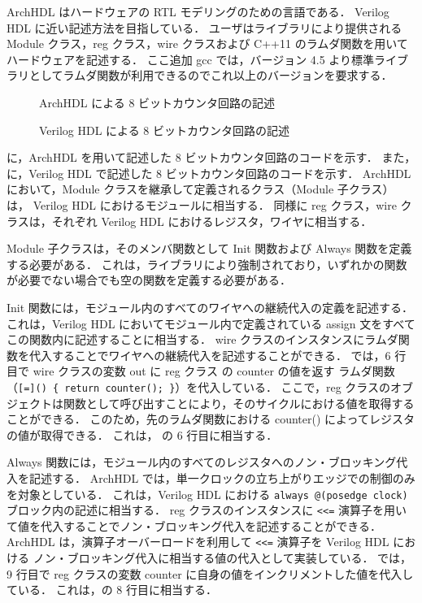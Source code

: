 ArchHDL はハードウェアの RTL モデリングのための言語である．
Verilog HDL に近い記述方法を目指している．
ユーザはライブラリにより提供される Module クラス，reg クラス，wire クラスおよび C++11 のラムダ関数を用いて
ハードウェアを記述する．
 ここ追加 \fi
{}
gcc では，バージョン 4.5 より標準ライブラリとしてラムダ関数が利用できるのでこれ以上のバージョンを要求する．
\fi

\begin{figure}[t]
 
 \caption{ArchHDL による 8 ビットカウンタ回路の記述}
 \label{src:counter}
\end{figure}

\begin{figure}[t]
 
 \caption{Verilog HDL による 8 ビットカウンタ回路の記述}
 \label{src:counter_v}
\end{figure}

に，ArchHDL を用いて記述した 8 ビットカウンタ回路のコードを示す．
また， に，Verilog HDL で記述した 8 ビットカウンタ回路のコードを示す．
ArchHDL において，Module クラスを継承して定義されるクラス（Module 子クラス）は，
Verilog HDL におけるモジュールに相当する．
同様に reg クラス，wire クラスは，それぞれ Verilog HDL におけるレジスタ，ワイヤに相当する．

Module 子クラスは，そのメンバ関数として Init 関数および Always 関数を定義する必要がある．
これは，ライブラリにより強制されており，いずれかの関数が必要でない場合でも空の関数を定義する必要がある．

Init 関数には，モジュール内のすべてのワイヤへの継続代入の定義を記述する．
これは，Verilog HDL においてモジュール内で定義されている assign 文をすべてこの関数内に記述することに相当する．
wire クラスのインスタンスにラムダ関数を代入することでワイヤへの継続代入を記述することができる．
では，6 行目で wire クラスの変数 out に reg クラス の counter の値を返す
ラムダ関数（\verb/[=]() { return counter(); }/）を代入している．
ここで，reg クラスのオブジェクトは関数として呼び出すことにより，そのサイクルにおける値を取得することができる．
このため，先のラムダ関数における counter() によってレジスタの値が取得できる．
これは， の 6 行目に相当する．

Always 関数には，モジュール内のすべてのレジスタへのノン・ブロッキング代入を記述する．
ArchHDL では，単一クロックの立ち上がりエッジでの制御のみを対象としている．
これは，Verilog HDL における \verb/always @(posedge clock)/ ブロック内の記述に相当する．
reg クラスのインスタンスに \verb/<<=/ 演算子を用いて値を代入することでノン・ブロッキング代入を記述することができる．
ArchHDL は，演算子オーバーロードを利用して \verb/<<=/ 演算子を Verilog HDL における
ノン・ブロッキング代入に相当する値の代入として実装している．
では，9 行目で reg クラスの変数 counter に自身の値をインクリメントした値を代入している．
これは，の 8 行目に相当する．

